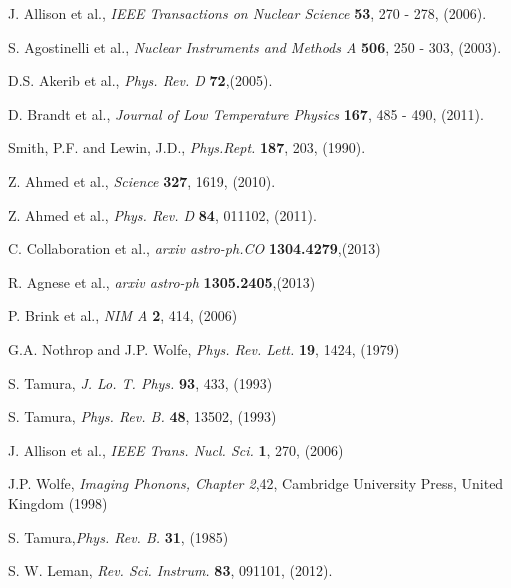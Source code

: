 \documentclass[preprint,12pt]{elsarticle}
\begin{document}
%
%
\begin{thebibliography}{99}

J. Allison et al., {\it IEEE Transactions on Nuclear Science} \textbf{53}, 270 - 278, (2006).

S. Agostinelli et al., {\it Nuclear Instruments and Methods A} \textbf{506}, 250 - 303, (2003).

D.S. Akerib et al., {\it Phys. Rev. D} \textbf{72},(2005).

D. Brandt et al., {\it Journal of Low Temperature Physics} \textbf{167}, 485 - 490, (2011).

Smith, P.F. and Lewin, J.D., {\it Phys.Rept.} \textbf{187}, 203, (1990).


Z. Ahmed et al., {\it Science} \textbf{327}, 1619, (2010).

Z. Ahmed et al., {\it Phys. Rev. D} \textbf{84}, 011102, (2011).

C. Collaboration et al., {\it arxiv astro-ph.CO} \textbf{1304.4279},(2013)

R. Agnese et al., {\it arxiv astro-ph} \textbf{1305.2405},(2013)





P. Brink et al., {\it NIM A} \textbf{2}, 414, (2006)


G.A. Nothrop and J.P. Wolfe, {\it Phys. Rev. Lett.} \textbf{19}, 1424, (1979)

S. Tamura, {\it J. Lo. T. Phys.} \textbf{93}, 433, (1993)

S. Tamura, {\it Phys. Rev. B.} \textbf{48}, 13502, (1993)

J. Allison et al., {\it IEEE Trans. Nucl. Sci.} \textbf{1}, 270, (2006)


J.P. Wolfe, {\it Imaging Phonons, Chapter 2},42, Cambridge University Press, United Kingdom (1998) 

S. Tamura,{\it Phys. Rev. B.} \textbf{31}, (1985)

S. W. Leman, {\it Rev. Sci. Instrum.} \textbf{83}, 091101, (2012).




\end{thebibliography}
\end{document}
